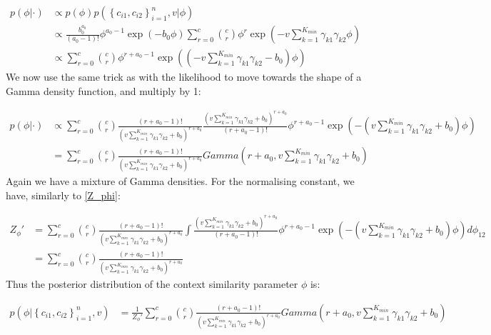 \documentclass[11pt]{article} %
\begin{document}
\begin{align}
p(\phi | \cdot) &\propto p(\phi) p(\left\{c_{i1}, c_{i2}\right\}_{i=1}^n, v | \phi)  \\
&\propto \frac{b_0^{a_0}}{(a_0 - 1)!}\phi^{a_0 - 1}\exp\left(-b_0 \phi \right)  \sum_{r=0}^c  \binom{c}{r}\phi^r \exp\left(-v \sum_{k=1}^{K_{min}} \gamma_{k1} \gamma_{k2}\phi\right) \\
&\propto \sum_{r=0}^c  \binom{c}{r} \phi^{r + a_0 - 1} \exp \left( \left(-v \sum_{k=1}^{K_{min}} \gamma_{k1} \gamma_{k2}  -b_0 \right)\phi\right)
\end{align}
We now use the same trick as with the likelihood to move towards the shape of a Gamma density function, and multiply by 1:

\begin{align}
p(\phi | \cdot) &\propto \sum_{r=0}^c  \binom{c}{r} \frac{(r + a_0 - 1)!}{ \left(v \sum_{k=1}^{K_{min}} \gamma_{k1} \gamma_{k2} + b_0 \right)^{r + a_0}} \frac{ \left(v \sum_{k=1}^{K_{min}} \gamma_{k1} \gamma_{k2} + b_0 \right)^{r + a_0}}{(r + a_0 - 1)!} \phi^{r + a_0 - 1} \exp \left( - \left(v \sum_{k=1}^{K_{min}} \gamma_{k1} \gamma_{k2} + b_0 \right)\phi\right) \\
&= \sum_{r=0}^c  \binom{c}{r} \frac{(r + a_0 - 1)!}{ \left(v \sum_{k=1}^{K_{min}} \gamma_{k1} \gamma_{k2} + b_0 \right)^{r + a_0}} Gamma \left(r+ a_0, v \sum_{k=1}^{K_{min}} \gamma_{k1} \gamma_{k2} + b_0 \right)
\end{align}
Again we have a mixture of Gamma densities. For the normalising constant, we have, similarly to \eqref{Z_phi}:

\begin{align}
Z_{\phi}' &=\sum_{r=0}^c  \binom{c}{r} \frac{(r + a_0 - 1)!}{ \left(v \sum_{k=1}^{K_{min}} \gamma_{k1} \gamma_{k2} + b_0 \right)^{r + a_0}}  \int \frac{ \left(v \sum_{k=1}^{K_{min}} \gamma_{k1} \gamma_{k2} + b_0 \right)^{r + a_0}}{(r + a_0 - 1)!} \phi^{r + a_0 - 1} \exp \left( - \left(v \sum_{k=1}^{K_{min}} \gamma_{k1} \gamma_{k2} + b_0 \right)\phi\right) d\phi_{12} \\
&= \sum_{r=0}^c \binom{c}{r} \frac{(r + a_0 - 1)!}{ \left(v \sum_{k=1}^{K_{min}} \gamma_{k1} \gamma_{k2} + b_0 \right)^{r + a_0}} 
\end{align}
Thus the posterior distribution of the context similarity parameter $\phi$ is:

\begin{align}
p(\phi |  \left\{c_{i1}, c_{i2}\right\}_{i=1}^n, v) &=  \frac{1}{Z_{\phi}'} \sum_{r=0}^c  \binom{c}{r} \frac{(r + a_0 - 1)!}{ \left(v \sum_{k=1}^{K_{min}} \gamma_{k1} \gamma_{k2} + b_0 \right)^{r + a_0}} Gamma \left(r+ a_0, v \sum_{k=1}^{K_{min}} \gamma_{k1} \gamma_{k2} + b_0 \right)
\end{align}

\newpage
%


\end{document}
